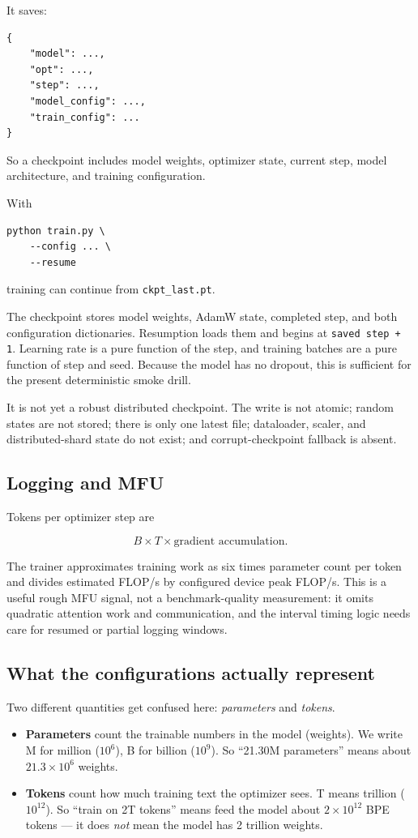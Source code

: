 It saves:
\begin{lstlisting}[style=shadedpython]
{
    "model": ...,
    "opt": ...,
    "step": ...,
    "model_config": ...,
    "train_config": ...
}
\end{lstlisting}
So a checkpoint includes model weights, optimizer state, current step, model
architecture, and training configuration.

With
\begin{lstlisting}[style=shadedpython]
python train.py \
    --config ... \
    --resume
\end{lstlisting}
training can continue from \texttt{ckpt\_last.pt}.

The checkpoint stores model weights, AdamW state, completed step, and both
configuration dictionaries. Resumption loads them and begins at
\texttt{saved step + 1}. Learning rate is a pure function of the step, and
training batches are a pure function of step and seed. Because the model has no
dropout, this is sufficient for the present deterministic smoke drill.

It is not yet a robust distributed checkpoint. The write is not atomic; random
states are not stored; there is only one latest file; dataloader, scaler, and
distributed-shard state do not exist; and corrupt-checkpoint fallback is absent.

\subsection{Logging and MFU}

Tokens per optimizer step are

\[
  B\times T\times\text{gradient accumulation}.
\]

The trainer approximates training work as six times parameter count per token
and divides estimated FLOP/s by configured device peak FLOP/s. This is a useful
rough MFU signal, not a benchmark-quality measurement: it omits quadratic
attention work and communication, and the interval timing logic needs care for
resumed or partial logging windows.

\subsection{What the configurations actually represent}

Two different quantities get confused here: \emph{parameters} and
\emph{tokens}.

\begin{itemize}
  \setlength{\itemsep}{0pt}
  \item \textbf{Parameters} count the trainable numbers in the model
    (weights). We write M for million (\(10^6\)), B for billion
    (\(10^9\)). So ``21.30M parameters'' means about \(21.3\times 10^6\)
    weights.
  \item \textbf{Tokens} count how much training text the optimizer sees.
    T means trillion (\(10^{12}\)). So ``train on 2T tokens'' means feed
    the model about \(2\times 10^{12}\) BPE tokens --- it does \emph{not}
    mean the model has 2 trillion weights.
\end{itemize}

